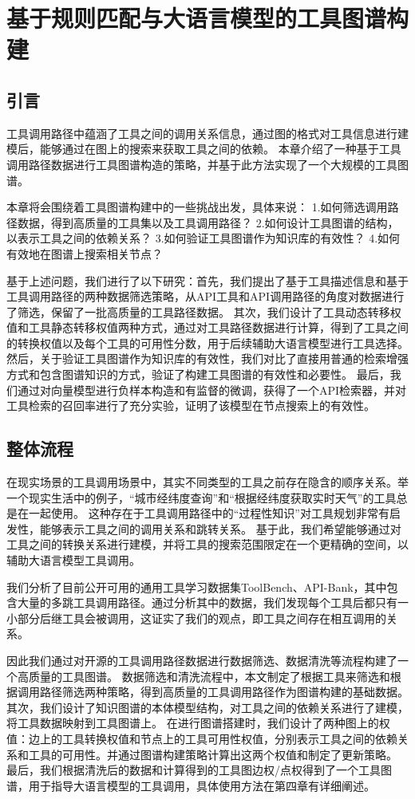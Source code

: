 \chapter{基于规则匹配与大语言模型的工具图谱构建}

\section{引言}

工具调用路径中蕴涵了工具之间的调用关系信息，通过图的格式对工具信息进行建模后，能够通过在图上的搜索来获取工具之间的依赖。
本章介绍了一种基于工具调用路径数据进行工具图谱构造的策略，并基于此方法实现了一个大规模的工具图谱。

本章将会围绕着工具图谱构建中的一些挑战出发，具体来说：
1.如何筛选调用路径数据，得到高质量的工具集以及工具调用路径？
2.如何设计工具图谱的结构，以表示工具之间的依赖关系？
3.如何验证工具图谱作为知识库的有效性？
4.如何有效地在图谱上搜索相关节点？

基于上述问题，我们进行了以下研究：首先，我们提出了基于工具描述信息和基于工具调用路径的两种数据筛选策略，从API工具和API调用路径的角度对数据进行了筛选，保留了一批高质量的工具路径数据。
其次，我们设计了工具动态转移权值和工具静态转移权值两种方式，通过对工具路径数据进行计算，得到了工具之间的转换权值以及每个工具的可用性分数，用于后续辅助大语言模型进行工具选择。
然后，关于验证工具图谱作为知识库的有效性，我们对比了直接用普通的检索增强方式和包含图谱知识的方式，验证了构建工具图谱的有效性和必要性。
最后，我们通过对向量模型进行负样本构造和有监督的微调，获得了一个API检索器，并对工具检索的召回率进行了充分实验，证明了该模型在节点搜索上的有效性。

\section{整体流程}

在现实场景的工具调用场景中，其实不同类型的工具之前存在隐含的顺序关系。举一个现实生活中的例子，“城市经纬度查询”和“根据经纬度获取实时天气”的工具总是在一起使用。
这种存在于工具调用路径中的“过程性知识”对工具规划非常有启发性，能够表示工具之间的调用关系和跳转关系。
基于此，我们希望能够通过对工具之间的转换关系进行建模，并将工具的搜索范围限定在一个更精确的空间，以辅助大语言模型工具调用。

我们分析了目前公开可用的通用工具学习数据集ToolBench、API-Bank，其中包含大量的多跳工具调用路径。通过分析其中的数据，我们发现每个工具后都只有一小部分后继工具会被调用，这证实了我们的观点，即工具之间存在相互调用的关系。

因此我们通过对开源的工具调用路径数据进行数据筛选、数据清洗等流程构建了一个高质量的工具图谱。
数据筛选和清洗流程中，本文制定了根据工具来筛选和根据调用路径筛选两种策略，得到高质量的工具调用路径作为图谱构建的基础数据。
其次，我们设计了知识图谱的本体模型结构，对工具之间的依赖关系进行了建模，将工具数据映射到工具图谱上。
在进行图谱搭建时，我们设计了两种图上的权值：边上的工具转换权值和节点上的工具可用性权值，分别表示工具之间的依赖关系和工具的可用性。并通过图谱构建策略计算出这两个权值和制定了更新策略。
最后，我们根据清洗后的数据和计算得到的工具图边权/点权得到了一个工具图谱，用于指导大语言模型的工具调用，具体使用方法在第四章有详细阐述。


